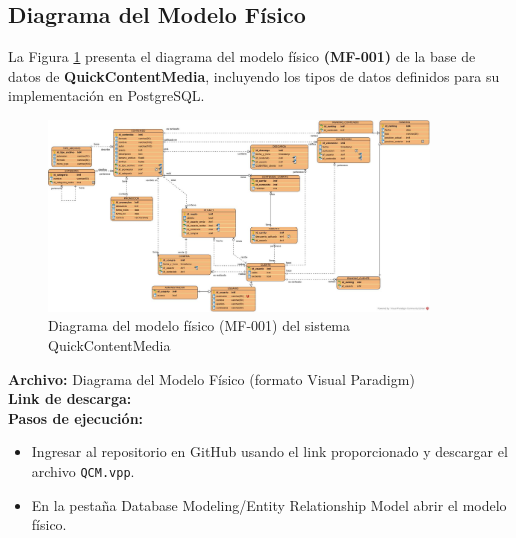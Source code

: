 \subsection{Diagrama del Modelo Físico}
La Figura \ref{fig:DiagramaModeloFisico} presenta el diagrama del modelo físico \textbf{(MF-001)} de la base de datos de \textbf{QuickContentMedia}, incluyendo los tipos de datos definidos para su implementación en PostgreSQL.

\begin{figure}[H]
    \centering
    \includegraphics[width=0.9\textwidth]{Media/5_Desarrollo/MF.jpg}
    \caption{Diagrama del modelo físico (MF-001) del sistema QuickContentMedia} 
    \label{fig:DiagramaModeloFisico}
\end{figure}

\textbf{Archivo:} Diagrama del Modelo Físico (formato Visual Paradigm) \\
\textbf{Link de descarga:} \linkDiagramaModeloFisico \\
\newpage
\textbf{Pasos de ejecución:}
\begin{itemize}
    \item Ingresar al repositorio en GitHub usando el link proporcionado y descargar el archivo \texttt{QCM.vpp}.
    \item En la pestaña Database Modeling/Entity Relationship Model abrir el modelo físico.
\end{itemize}